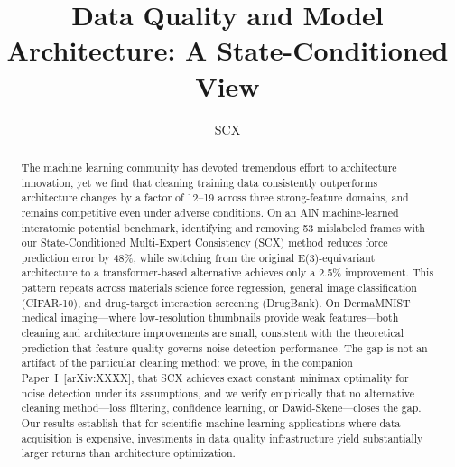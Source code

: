 %

\title{Data Quality and Model Architecture: A State-Conditioned View}

\author{SCX}



\maketitle

\begin{abstract}
The machine learning community has devoted tremendous effort to architecture innovation, yet we find that cleaning training data consistently outperforms architecture changes by a factor of 12--19 across three strong-feature domains, and remains competitive even under adverse conditions. On an AlN machine-learned interatomic potential benchmark, identifying and removing 53 mislabeled frames with our State-Conditioned Multi-Expert Consistency (SCX) method reduces force prediction error by 48\%, while switching from the original E(3)-equivariant architecture to a transformer-based alternative achieves only a 2.5\% improvement. This pattern repeats across materials science force regression, general image classification (CIFAR-10), and drug-target interaction screening (DrugBank). On DermaMNIST medical imaging---where low-resolution thumbnails provide weak features---both cleaning and architecture improvements are small, consistent with the theoretical prediction that feature quality governs noise detection performance. The gap is not an artifact of the particular cleaning method: we prove, in the companion Paper~I~[arXiv:XXXX], that SCX achieves exact constant minimax optimality for noise detection under its assumptions, and we verify empirically that no alternative cleaning method---loss filtering, confidence learning, or Dawid-Skene---closes the gap. Our results establish that for scientific machine learning applications where data acquisition is expensive, investments in data quality infrastructure yield substantially larger returns than architecture optimization.
\end{abstract}

